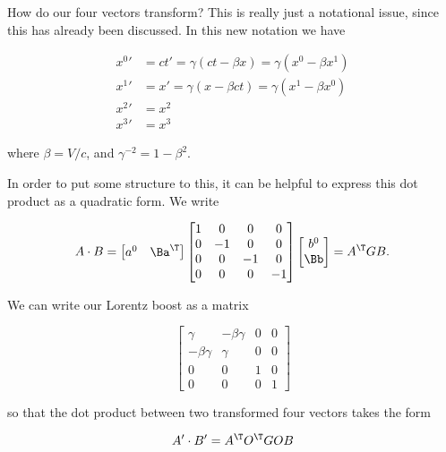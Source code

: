 How do our four vectors transform?  This is really just a notational issue, since this has already been discussed.  In this new notation we have

\begin{equation}\label{eqn:relativisticElectrodynamicsT1:90}
\begin{aligned}
{x^0}' &= ct' = \gamma ( ct - \beta x) = \gamma ( x^0 - \beta x^1 ) \\
{x^1}' &= x' = \gamma ( x - \beta ct ) = \gamma ( x^1 - \beta x^0 ) \\
{x^2}' &= x^2 \\
{x^3}' &= x^3
\end{aligned}
\end{equation}

where $\beta = V/c$, and $\gamma^{-2} = 1 - \beta^2$.

In order to put some structure to this, it can be helpful to express this dot product as a quadratic form.  We write

\begin{equation}\label{eqn:relativisticElectrodynamicsT1:100}
\begin{aligned}
A \cdot B = 
\begin{bmatrix}
a^0 & \Ba^\T 
\end{bmatrix}
\begin{bmatrix}
1 & 0 & 0 & 0 \\
0 & -1 & 0 & 0 \\
0 & 0 & -1 & 0 \\
0 & 0 & 0 & -1 
\end{bmatrix}
\begin{bmatrix}
b^0 \\
\Bb
\end{bmatrix}
= A^\T G B.
\end{aligned}
\end{equation}

We can write our Lorentz boost as a matrix

\begin{equation}\label{eqn:relativisticElectrodynamicsT1:110}
\begin{bmatrix}
\gamma & -\beta \gamma & 0 & 0 \\
-\beta \gamma & \gamma & 0 & 0 \\
0 & 0 & 1 & 0 \\
0 & 0 & 0 & 1 
\end{bmatrix}
\end{equation}

so that the dot product between two transformed four vectors takes the form

\begin{equation}\label{eqn:relativisticElectrodynamicsT1:120}
A' \cdot B' = A^\T O^\T G O B
\end{equation}
